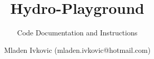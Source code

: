 



\title{Hydro-Playground}
\subtitle{Code Documentation and Instructions}
\author{Mladen Ivkovic (mladen.ivkovic@hotmail.com)}
\date{}









	



\maketitle
\newpage
\tableofcontents
\newpage










% 
% 
% 
% 
% 
% 
% 
% 
% 
% 




















% 








